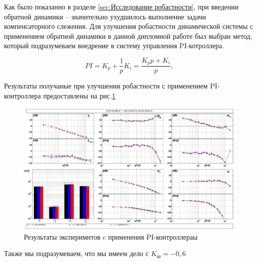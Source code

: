 Как было показанно в разделе \ref{sec:Исследование робастности}, при введении обратной динамики -- 
значительно ухудшилось выполнение задачи компенсаторного слежения. Для улучшения робастности динамической системы с применением обратной
динамики в данной дипломной работе был выбран метод, который подразумеваем внедрение в систему управления PI-котроллера.

\begin{equation}
    \label{eq:PI}
    PI = K_p + \frac{1}{p}K_i = \frac{K_p p + K_i}{p},
\end{equation}


Результаты получаные при улучшении робастности с применением PI-контроллера предоставлены на рис.\ref{fig:Модель с PI}

\begin{figure}[H]
    \centering \includegraphics[width=\linewidth]{Оглавление/Part3/figures/Модель с PI.jpg}
    \caption{Результаты эксперимнтов c применения PI-контроллераы}
    \label{fig:Модель с PI}
\end{figure}



    Также мы подразумеваем, что мы имеем дело с $K_\text{ш} = -0,6$
